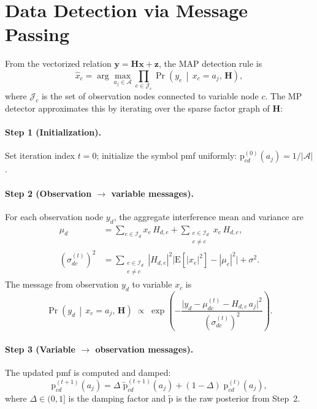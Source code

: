 \documentclass[11pt,a4paper]{article}
\begin{document}
\section{Data Detection via Message Passing}
\label{sec:mp}

From the vectorized relation $\mathbf{y}=\mathbf{H}\mathbf{x}+\mathbf{z}$,
the MAP detection rule is
\begin{equation}
  \hat{x}_c = \arg\max_{a_j\in\mathcal{A}}
  \prod_{e\in\mathcal{J}_c}
  \Pr\!\left(y_e \,\middle|\, x_c = a_j,\,\mathbf{H}\right),
\end{equation}
where $\mathcal{J}_c$ is the set of observation nodes connected to
variable node $c$. The MP detector approximates this by iterating
over the sparse factor graph of $\mathbf{H}$:

\paragraph{Step 1 (Initialization).}
Set iteration index $t=0$; initialize the symbol pmf uniformly:
$\mathrm{p}_{cd}^{(0)}(a_j) = 1/|\mathcal{A}|$.

\paragraph{Step 2 (Observation $\to$ variable messages).}
For each observation node $y_d$, the aggregate interference mean and
variance are
\begin{align}
  \mu_d &= \sum_{e\in\mathcal{I}_d} x_e\,H_{d,e}
  + \sum_{\substack{e\in\mathcal{I}_d\\e\ne c}} x_e\,H_{d,e},
  \label{eq:mp_mean}\\
  (\sigma_{dc}^{(t)})^2 &=
  \sum_{\substack{e\in\mathcal{I}_d\\e\ne c}}
  |H_{d,e}|^2\bigl|\mathrm{E}[|x_e|^2] - |\mu_e|^2\bigr|
  + \sigma^2.
  \label{eq:mp_var}
\end{align}
The message from observation $y_d$ to variable $x_c$ is
\begin{equation}
  \Pr\!\left(y_d\,\middle|\,x_c=a_j,\,\mathbf{H}\right)
  \;\propto\;
  \exp\!\left(
  -\frac{\bigl|y_d - \mu_{dc}^{(t)} - H_{d,c}\,a_j\bigr|^2}
        {(\sigma_{dc}^{(t)})^2}\right).
\end{equation}

\paragraph{Step 3 (Variable $\to$ observation messages).}
The updated pmf is computed and damped:
\begin{equation}
  \mathrm{p}_{cd}^{(t+1)}(a_j)
  = \Delta\;\tilde{\mathrm{p}}_{cd}^{(t+1)}(a_j)
  + (1-\Delta)\;\mathrm{p}_{cd}^{(t)}(a_j),
\end{equation}
where $\Delta\in(0,1]$ is the damping factor and
$\tilde{\mathrm{p}}$ is the raw posterior from Step~2.
\end{document}
